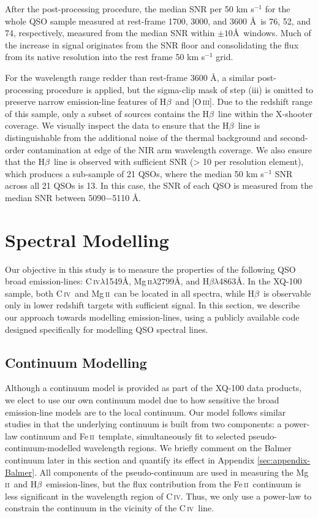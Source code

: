 \documentclass[fleqn,usenatbib]{mnras}
\newcommand{\mgii}{Mg\,\textsc{ii}}
\newcommand{\civ}{C\,\textsc{iv}}
\newcommand{\feii}{Fe\,\textsc{ii}}
\newcommand{\oiii}{[O\,\textsc{iii}]}
\newcommand{\hbeta}{H\textsc{$\beta$}}
\newcommand{\mgiil}{Mg\,\textsc{ii}$\lambda$2799}
\newcommand{\civl}{C\,\textsc{iv}$\lambda$1549}
\newcommand{\hbetal}{H\textsc{$\beta$}$\lambda$4863}
\begin{document}
After the post-processing procedure, the median SNR per 50 km s$^{-1}$ for the whole QSO sample measured at rest-frame 1700, 3000, and 3600 \AA\ is 76, 52, and 74, respectively, measured from the median SNR within $\pm10$\AA\ windows. Much of the increase in signal originates from the SNR floor and consolidating the flux from its native resolution into the rest frame 50 km s$^{-1}$ grid. 

For the wavelength range redder than rest-frame 3600 \AA, a similar post-processing procedure is applied, but the sigma-clip mask of step (iii) is omitted to preserve narrow emission-line features of \hbeta\ and \oiii. Due to the redshift range of this sample, only a subset of sources contains the \hbeta\ line within the X-shooter coverage. We visually inspect the data to ensure that the \hbeta\ line is distinguishable from the additional noise of the thermal background and second-order contamination at edge of the NIR arm wavelength coverage. We also ensure that the \hbeta\ line is observed with sufficient SNR (> 10 per resolution element), which produces a sub-sample of 21 QSOs, where the median 50 km s$^{-1}$ SNR across all 21 QSOs is 13. In this case, the SNR of each QSO is measured from the median SNR between 5090$-$5110 \AA.  

\section{Spectral Modelling} \label{sec:spectral_fitting}
Our objective in this study is to measure the properties of the following QSO broad emission-lines: \civl\AA, \mgiil\AA, and \hbetal\AA. In the XQ-100 sample, both \civ\ and \mgii\ can be located in all spectra, while \hbeta\ is observable only in lower redshift targets with sufficient signal. In this section, we describe our approach towards modelling emission-lines, using a publicly available code \citep[\texttt{PyQSpecFit}\footnote{\hyperlink{https://github.com/samlaihei/PyQSpecFit}{https://github.com/samlaihei/PyQSpecFit}};][]{PyQSpecFit_v1} designed specifically for modelling QSO spectral lines.

\subsection{Continuum Modelling} \label{sec:cont-fitting}

Although a continuum model is provided as part of the XQ-100 data products, we elect to use our own continuum model due to how sensitive the broad emission-line models are to the local continuum. Our model follows similar studies \citep[e.g.,][]{Wang_2009} in that the underlying continuum is built from two components: a power-law continuum and \feii\ template, simultaneously fit to selected pseudo-continuum-modelled wavelength regions. We briefly comment on the Balmer continuum later in this section and quantify its effect in Appendix \ref{sec:appendix-Balmer}. All components of the pseudo-continuum are used in measuring the \mgii\ and \hbeta\ emission-lines, but the flux contribution from the \feii\ continuum is less significant in the wavelength region of \civ. Thus, we only use a power-law to constrain the continuum in the vicinity of the \civ\ line.
\end{document}
